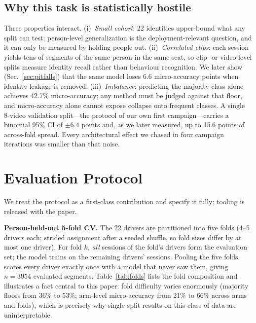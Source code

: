\documentclass[journal]{IEEEtran}
\newcommand{\micro}{micro-accuracy}
\begin{document}
\subsection{Why this task is statistically hostile}
\label{sec:hostile}
Three properties interact.
(i)~\emph{Small cohort}: 22 identities upper-bound what any split can test;
person-level generalization is the deployment-relevant question, and it can
only be measured by holding people out.
(ii)~\emph{Correlated clips}: each session yields tens of segments of the
same person in the same seat, so clip- or video-level splits measure
identity recall rather than behaviour recognition.  We later show
(Sec.~\ref{sec:pitfalls}) that the same model loses 6.6 \micro{} points when
identity leakage is removed.
(iii)~\emph{Imbalance}: predicting the majority class alone achieves 42.7\%
\micro{}; any method must be judged against that floor, and \micro{} alone
cannot expose collapse onto frequent classes.
A single 8-video validation split---the protocol of our own first
campaign---carries a binomial 95\% CI of $\pm6.4$ points and, as we later
measured, up to 15.6 points of across-fold spread.  Every architectural
effect we chased in four campaign iterations was smaller than that noise.

\section{Evaluation Protocol}
\label{sec:protocol}
We treat the protocol as a first-class contribution and specify it fully;
tooling is released with the paper.

\textbf{Person-held-out 5-fold CV.}  The 22 drivers are partitioned into
five folds (4--5 drivers each; strided assignment after a seeded shuffle, so
fold sizes differ by at most one driver).  For fold $k$, \emph{all} sessions
of the fold's drivers form the evaluation set; the model trains on the
remaining drivers' sessions.  Pooling the five folds scores every driver
exactly once with a model that never saw them, giving $n{=}3954$ evaluated
segments.  Table~\ref{tab:folds} lists the fold composition and illustrates
a fact central to this paper: fold difficulty varies enormously (majority
floors from 36\% to 53\%; arm-level \micro{} from 21\% to 66\% across arms
and folds), which is precisely why single-split results on this class of
data are uninterpretable.
\end{document}
